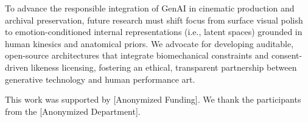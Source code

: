 \documentclass[pdflatex,sn-mathphys-num]{sn-jnl}
\theoremstyle{thmstyleone}
\theoremstyle{thmstyletwo}
\theoremstyle{thmstylethree}
\begin{document}
To advance the responsible integration of GenAI in cinematic production and archival preservation, future research must shift focus from surface visual polish to emotion-conditioned internal representations (i.e., latent spaces) grounded in human kinesics and anatomical priors. We advocate for developing auditable, open-source architectures that integrate biomechanical constraints and consent-driven likeness licensing, fostering an ethical, transparent partnership between generative technology and human performance art.

{}
This work was supported by [Anonymized Funding]. We thank the participants from the [Anonymized Department].


\end{document}
